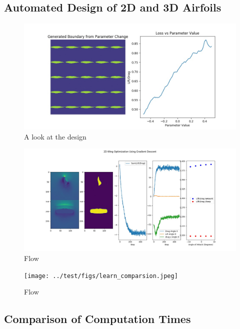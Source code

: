 \documentclass{article} %
\begin{document}
\subsection{Automated Design of 2D and 3D Airfoils}

\begin{figure}[h]
\begin{center}
\includegraphics[scale=0.30]{../test/figs/boundary_space_explore.jpeg}
\end{center}
\caption{A look at the design }
\end{figure}

\begin{figure}[h]
\begin{center}
\includegraphics[scale=0.30]{../test/figs/learn_gradient_descent.jpeg}
\end{center}
\caption{Flow}
\end{figure}

\begin{figure}[h]
\begin{center}
\texttt{[image: ../test/figs/learn\_comparsion.jpeg]}
\end{center}
\caption{Flow}
\end{figure}

\subsection{Comparison of Computation Times}
\end{document}
